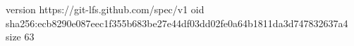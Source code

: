 version https://git-lfs.github.com/spec/v1
oid sha256:ecb8290e087eec1f355b683be27e44df03dd02fe0a64b1811da3d747832637a4
size 63
